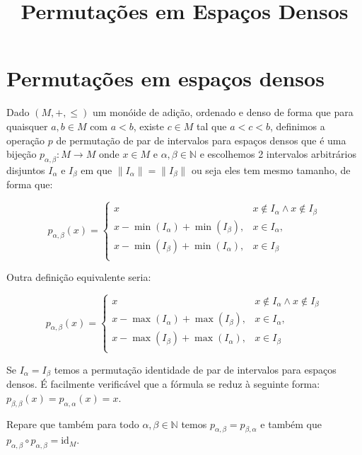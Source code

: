 \documentclass[12pt,a4paper]{article}
\title{Permutações em Espaços Densos}
\author{}
\date{}
\begin{document}
\maketitle

\section{Permutações em espaços densos}

Dado $(M, +, \leq)$ um monóide de adição, ordenado e denso de forma que para quaisquer $a,b \in M$ com $a<b$, existe $c \in M$ tal que $a < c < b$, definimos a operação $p$ de permutação de par de intervalos para espaços densos que é uma bijeção $p_{\alpha,\beta}: M \to M$ onde $x \in M$ e $\alpha,\beta \in \mathbb{N}$ e escolhemos 2 intervalos arbitrários disjuntos $I_{\alpha}$ e $I_{\beta}$ em que $\|I_{\alpha}\|=\|I_{\beta}\|$ ou seja eles tem mesmo tamanho, de forma que:

\begin{equation}
 p_{\alpha,\beta}{(x)} = \begin{cases} 
    x & x \not\in I_{\alpha} \land x \not \in I_{\beta}\\
    x - \min(I_{\alpha}) + \min(I_{\beta}), & x \in I_{\alpha},\\
    x - \min(I_{\beta}) + \min(I_{\alpha}), & x \in I_{\beta}\\
\end{cases}
\end{equation}

Outra definição equivalente seria:

\begin{equation}
 p_{\alpha,\beta}{(x)} = \begin{cases} 
    x & x \not\in I_{\alpha}\land x \not \in I_\beta\\
    x - \max(I_{\alpha}) + \max(I_{\beta}), & x \in I_{\alpha},\\
    x - \max(I_{\beta}) + \max(I_{\alpha}), & x \in I_{\beta}\\
\end{cases}
\end{equation}

Se $I_{\alpha} = I_{\beta}$ temos a permutação identidade de par de intervalos para espaços densos. É facilmente verificável que a fórmula se reduz à seguinte forma: $p_{\beta,\beta}{(x)} = p_{\alpha,\alpha}{(x)} = x$.

Repare que também para todo $\alpha,\beta \in \mathbb{N}$ temos $p_{\alpha,\beta} = p_{\beta, \alpha}$ e também que $p_{\alpha,\beta} \circ p_{\alpha,\beta}= \text{id}_M$.
\end{document}
